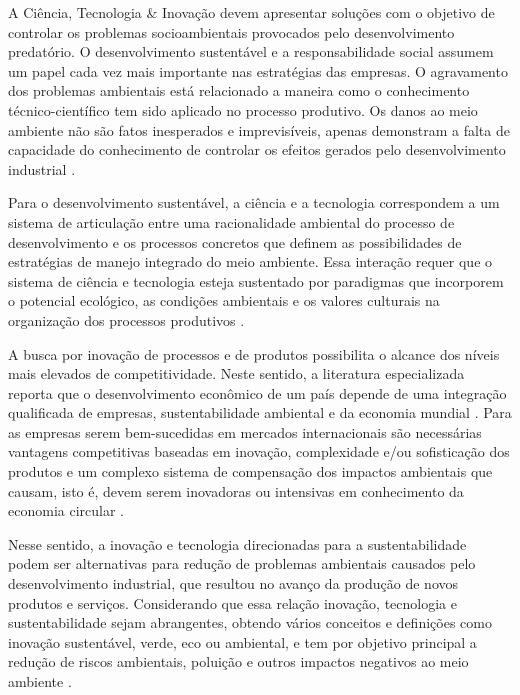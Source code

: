 A Ciência, Tecnologia \& Inovação devem apresentar soluções com o objetivo de controlar os problemas socioambientais provocados pelo desenvolvimento predatório. O desenvolvimento sustentável e a responsabilidade social assumem um papel cada vez mais importante nas estratégias das empresas. O agravamento dos problemas ambientais está relacionado a maneira como o conhecimento técnico-científico tem sido aplicado no processo produtivo. Os danos ao meio ambiente não são fatos inesperados e imprevisíveis, apenas demonstram a falta de capacidade do conhecimento de controlar os efeitos gerados pelo desenvolvimento industrial \cite{maranhao_dinamica_2016}.


Para o desenvolvimento sustentável, a ciência e a tecnologia correspondem a um sistema de articulação entre uma racionalidade ambiental do processo de desenvolvimento e os processos concretos que definem as possibilidades de estratégias de manejo integrado do meio ambiente. Essa interação requer que o sistema de ciência e tecnologia esteja sustentado por paradigmas que incorporem o potencial ecológico, as condições ambientais e os valores culturais na organização dos processos produtivos \cite{furlan_gestao_2018}.

A busca por inovação de processos e de produtos possibilita o alcance dos níveis mais elevados de competitividade. Neste sentido, a literatura especializada reporta que o desenvolvimento econômico de um país depende de uma integração qualificada de empresas, sustentabilidade ambiental e da economia mundial \cite{swinburn_desenvolvimento_2006}. Para as empresas serem bem-sucedidas em mercados internacionais são necessárias vantagens competitivas baseadas em inovação, complexidade e/ou sofisticação dos produtos e um complexo sistema de compensação dos impactos ambientais que causam, isto é, devem serem inovadoras ou intensivas em conhecimento da economia circular \cite{lucas_desenvolvimento_2019}.


Nesse sentido, a inovação e tecnologia direcionadas para a sustentabilidade podem ser alternativas para redução de problemas ambientais causados pelo desenvolvimento industrial, que resultou no avanço da produção de novos produtos e serviços. Considerando que essa relação inovação, tecnologia e sustentabilidade sejam abrangentes, obtendo vários conceitos e definições como inovação sustentável, verde, eco ou ambiental, e tem por objetivo principal a redução de riscos ambientais, poluição e outros impactos negativos ao meio ambiente
\cite{pinsky_inovacao_2017}.  

